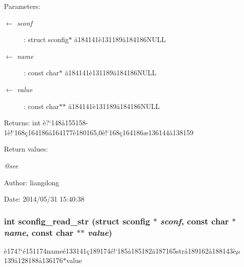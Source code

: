 \begin{Desc}
\item[Parameters:]
\begin{description}
\item[\mbox{$\leftarrow$} {\em sconf}]: struct sconfig$\ast$ \"{a}184141\`{e}131189\"{a}184186NULL \item[\mbox{$\leftarrow$} {\em name}]: const char$\ast$ \"{a}184141\`{e}131189\"{a}184186NULL \item[\mbox{$\leftarrow$} {\em value}]: const char$\ast$$\ast$ \"{a}184141\`{e}131189\"{a}184186NULL \end{description}
\end{Desc}
\begin{Desc}
\item[Returns:]int \`{e}?`148\aa{}155158-1\`{e}!`168\c{c}164186\aa{}164177\`{e}180165,0\`{e}!`168\c{c}164186\ae{}136144\aa{}138159 \end{Desc}
\begin{Desc}
\item[Return values:]
\begin{description}
\item[{\em @see}]\end{description}
\end{Desc}
\begin{Desc}
\item[Author:]liangdong \end{Desc}
\begin{Desc}
\item[Date:]2014/05/31 15:40:38 \end{Desc}
\subsubsection{\setlength{\rightskip}{0pt plus 5cm}int sconfig\_\-read\_\-str (struct sconfig $\ast$ {\em sconf}, const char $\ast$ {\em name}, const char $\ast$$\ast$ {\em value})}\label{sconfig_8c_a6}


\`{e}174?`\'{e}151174name\'{e}133141\c{c}189174\'{e}!`185\aa{}185182\"{a}187165str\aa{}189162\aa{}188143\`{e}$\mu$139\aa{}128188\aa{}136176$\ast$value 

